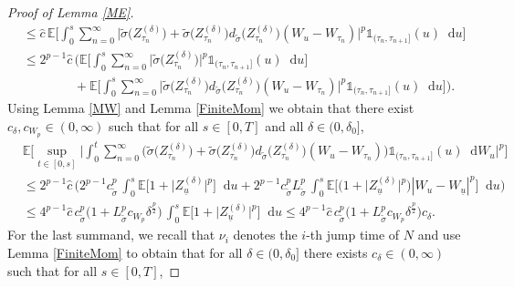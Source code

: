\documentclass[11pt,a4paper]{article}
\numberwithin{equation}{section}
\theoremstyle{definition}
\newcommand{\E}{{\mathbb{E}}}
\newcommand{\diff}{\mathop{}\!\mathrm{d}}
\begin{document}
\begin{proof}[Proof of Lemma \ref{ME}]
\begin{equation}
\begin{aligned}
    &\leq \hat c\, \E\Big[\int_0^s \sum_{n=0}^{\infty} \big|\widetilde \sigma\big(Z^{(\delta)}_{\tau_{n}}\big) + \widetilde\sigma \big(Z^{(\delta)}_{\tau_n}\big) d_{\widetilde\sigma} \big(Z^{(\delta)}_{\tau_n}\big) (W_{u}-W_{\tau_n}) \big|^p\mathds{1}_{(\tau_n,\tau_{n+1}]}(u) \diff u \Big]\\
    &\leq 2^{p-1} \hat c\, \Big( \E\Big[\int_0^s \sum_{n=0}^{\infty} \big|\widetilde \sigma\big(Z^{(\delta)}_{\tau_{n}}\big) \Big|^p \mathds{1}_{(\tau_n,\tau_{n+1}]}(u) \diff u \big] \\
    &\quad\quad\quad\quad + \E\Big[\int_0^s \sum_{n=0}^{\infty} \big|\widetilde\sigma \big(Z^{(\delta)}_{\tau_n}\big) d_{\widetilde\sigma} \big(Z^{(\delta)}_{\tau_n}\big) (W_{u}-W_{\tau_n}) \big|^p \mathds{1}_{(\tau_n,\tau_{n+1}]}(u) \diff u \Big]\Big).
\end{aligned}
\end{equation}
Using Lemma \ref{MW} and Lemma \ref{FiniteMom} we obtain that there exist $c_\delta, c_{W_p}\in(0,\infty)$ such that for all $s\in[0,T]$ and all $\delta\in(0,\delta_0]$,
\begin{equation}
    \begin{aligned}\label{ME16}
    &\E\Big[\sup_{t\in[0,s]}\Big|\int_0^t \sum_{n=0}^{\infty} \Big(\widetilde \sigma\big(Z^{(\delta)}_{\tau_{n}}\big) + \widetilde\sigma \big(Z^{(\delta)}_{\tau_n}\big) d_{\widetilde\sigma} \big(Z^{(\delta)}_{\tau_n}\big) (W_{u}-W_{\tau_n}) \Big)\mathds{1}_{(\tau_n,\tau_{n+1}]}(u) \diff W_u\Big|^p\Big]\\
    &\leq 2^{p-1} \hat c\, \Big(  2^{p-1} c_{\widetilde \sigma}^p\, \int_0^s \E\Big[ 1+ \big|Z^{(\delta)}_{\underline u}\big|^p\Big] \diff u  
    + 2^{p-1} c_{\widetilde\sigma}^p L_{\widetilde\sigma}^p \, \int_0^s \E\Big[ \big(1+ \big|Z^{(\delta)}_{\underline u}\big|^p\big)  |W_{u}-W_{\underline u}|^p \Big]  \diff u \Big)\\
    &\leq  4^{p-1} \hat c\, c_{\widetilde \sigma}^p \big( 1
    + L_{\widetilde\sigma}^p c_{W_p} \delta^{\frac{p}{2}}\big) \, \int_0^s \E\big[ 1+ \big|Z^{(\delta)}_{\underline u}\big|^p\big]  \diff u
    \leq  4^{p-1} \hat c\, c_{\widetilde \sigma}^p \big( 1
    + L_{\widetilde\sigma}^p c_{W_p} \delta^{\frac{p}{2}}\big) c_\delta.
\end{aligned}
\end{equation}
For the last summand, we recall that $\nu_i$ denotes the $i$-th jump time of $N$ and use Lemma \ref{FiniteMom} to obtain that for all $\delta\in(0,\delta_0]$ there exists $c_\delta\in(0,\infty)$ such that for all $s\in[0,T]$,

\end{proof}
\end{document}
